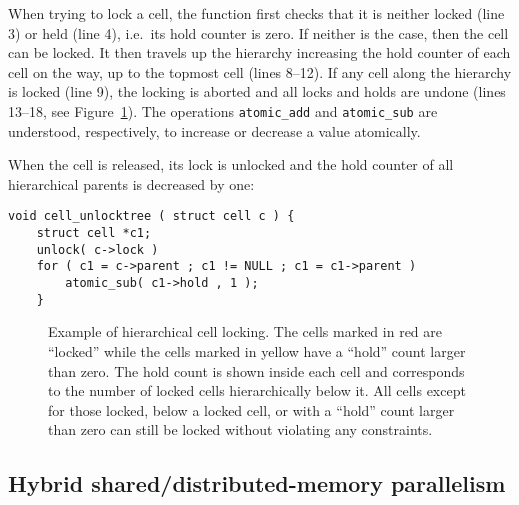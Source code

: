 \documentclass[final]{siamltex}
\newcommand{\fig}[1]
    {Figure~\ref{fig:#1}}
\begin{document}
\noindent When trying to lock a cell, the function first checks that it is neither
locked (line 3) or held (line 4), i.e.~its hold counter is zero.
If neither is the case, then the cell can be locked.
It then travels up the hierarchy increasing the 
hold counter of each cell on the way, up to the topmost cell (lines 8--12).
If any cell along the hierarchy is locked (line 9), the locking is aborted
and all locks and holds are undone (lines 13--18, see \fig{CellLocking}).
The operations {\tt atomic\_add} and {\tt atomic\_sub} are understood,
respectively, to increase or decrease a value atomically.

When the cell is released, its lock is unlocked and the hold
counter of all hierarchical parents is decreased by one:

\begin{center}\begin{minipage}{0.8\textwidth}
    \begin{lstlisting}
void cell_unlocktree ( struct cell c ) {
    struct cell *c1;
    unlock( c->lock )
    for ( c1 = c->parent ; c1 != NULL ; c1 = c1->parent )
        atomic_sub( c1->hold , 1 );
    }
    \end{lstlisting}
\end{minipage}\end{center}


\begin{figure}
    \centerline{}
    
    \caption{Example of hierarchical cell locking. The cells marked in red
        are ``locked'' while the cells marked in yellow have a ``hold'' count
        larger than zero.
        The hold count is shown inside each cell and corresponds to the number
        of locked cells hierarchically below it.
        All cells except for those locked, below a locked cell, or with
        a ``hold'' count larger than
        zero can still be locked without violating any constraints.
        }
    \label{fig:CellLocking}
\end{figure}


\subsection{Hybrid shared/distributed-memory parallelism}
\end{document}
